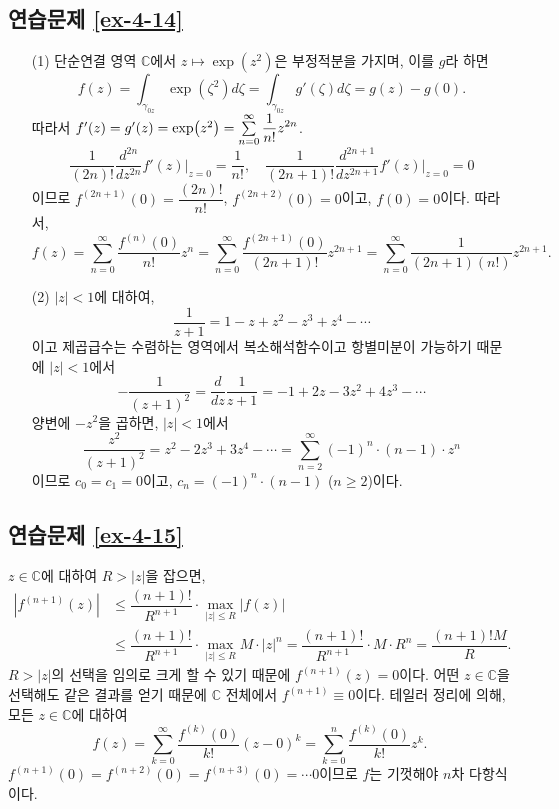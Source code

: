 \subsection*{연습문제 \ref{ex-4-14}}

\begin{itemize}
\item[(1)] 
단순연결 영역 $\mathbb C$에서
$z\mapsto \exp(z^2)$은 부정적분을 가지며, 이를 $g$라 하면
\[
f(z) = \int_{\gamma_{0z}} \exp(\zeta^2) d\zeta 
= \int_{\gamma_{0z}} g'(\zeta) d\zeta = g(z) - g(0).
\]
따라서 $f'(z) = g'(z) = \exp(z^2) = \sum\limits_{n=0}^\infty \displaystyle\frac1{n!}z^{2n}$.
\[
\dfrac1{(2n)!} \dfrac{d^{2n}}{dz^{2n}}f'(z) \Big|_{z=0} = \dfrac1{n!}, 
\quad
\dfrac1{(2n+1)!} \dfrac{d^{2n+1}}{dz^{2n+1}}f'(z) \Big|_{z=0} = 0
\]
이므로
$f^{(2n+1)}(0) = \dfrac{(2n)!}{n!}$, $f^{(2n+2)}(0) = 0$이고, $f(0)=0$이다.
따라서,
\[
f(z) = \sum_{n=0}^\infty \dfrac{f^{(n)}(0)}{n!} z^n 
= \sum_{n=0}^\infty \dfrac{f^{(2n+1)}(0)}{(2n+1)!} z^{2n+1}
= \sum_{n=0}^\infty \dfrac1{(2n+1)(n!)} z^{2n+1}.
\]
\item[(2)] 
$|z|<1$에 대하여,
\[
\dfrac1{z+1} = 1 - z + z^2 - z^3 + z^4 - \cdots
\]
이고 제곱급수는 수렴하는 영역에서 복소해석함수이고 항별미분이 가능하기 때문에
$|z|<1$에서
\[
- \dfrac1{(z+1)^2} = \dfrac d{dz}\dfrac1{z+1} = - 1 + 2z - 3z^2 + 4z^3 - \cdots
\]
양변에 $-z^2$을 곱하면, $|z|<1$에서
\[
 \dfrac{z^2}{(z+1)^2} =z^2 - 2z^3 + 3z^4 - \cdots
= \sum_{n=2}^\infty (-1)^n\cdot (n-1)\cdot z^n
\]
이므로 $c_0=c_1=0$이고, $c_n =(-1)^n\cdot(n-1)$ ($n\ge2$)이다.
\end{itemize}

\subsection*{연습문제 \ref{ex-4-15}}

$z\in\mathbb C$에 대하여 $R>|z|$을 잡으면,
\begin{align*}
|f^{(n+1)}(z)| &\le \dfrac{(n+1)!}{R^{n+1}}\cdot \max_{|z|\le R} |f(z)| \\
&\le \dfrac{(n+1)!}{R^{n+1}}\cdot \max_{|z|\le R} M\cdot |z|^n 
= \dfrac{(n+1)!}{R^{n+1}}\cdot M\cdot R^n = \dfrac{(n+1)!M}R.
\end{align*}
$R>|z|$의 선택을 임의로 크게 할 수 있기 때문에
$f^{(n+1)}(z) = 0$이다.
어떤 $z\in \mathbb C$을 선택해도 같은 결과를 얻기 때문에
$\mathbb C$ 전체에서 $f^{(n+1)} \equiv 0$이다.
테일러 정리에 의해,  모든 $z\in \mathbb C$에 대하여
\[
f(z) = \sum_{k=0}^\infty \dfrac{f^{(k)}(0)}{k!} (z-0)^k
= \sum_{k=0}^n \dfrac{f^{(k)}(0)}{k!} z^k.
\]
$f^{(n+1)}(0) = f^{(n+2)}(0) = f^{(n+3)}(0) = \cdots 0$이므로
$f$는 기껏해야 $n$차 다항식이다.

